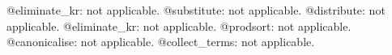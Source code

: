 \documentclass[11pt]{article}
\begin{document}
@eliminate\_kr: not applicable.
@substitute: not applicable.
@distribute: not applicable.
@eliminate\_kr: not applicable.
@prodsort: not applicable.
@canonicalise: not applicable.
@collect\_terms: not applicable.
\end{document}
